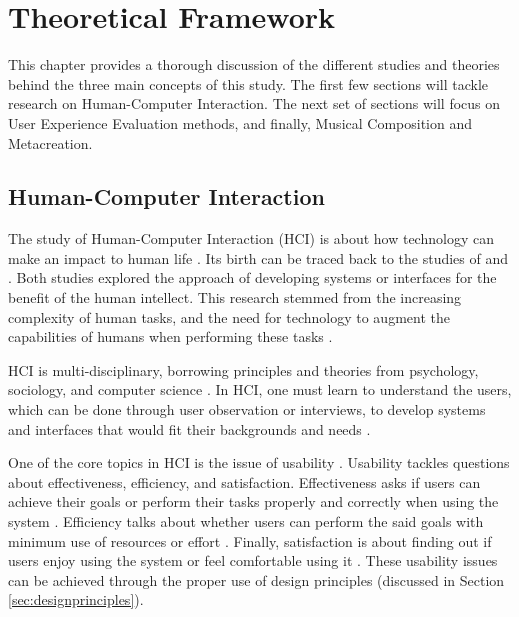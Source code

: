 %
%
%                 

\chapter{Theoretical Framework}

This chapter provides a thorough discussion of the different studies and theories behind the three main concepts of this study. The first few sections will tackle research on Human-Computer Interaction. The next set of sections will focus on User Experience Evaluation methods, and finally, Musical Composition and Metacreation. 

\section{Human-Computer Interaction}

	The study of Human-Computer Interaction (HCI) is about how technology can make an impact to human life \citep{dix2009human}. Its birth can be traced back to the studies of \citet{shackel1959ergonomics} and \citet{engelbart1962augmenting}. Both studies explored the approach of developing systems or interfaces for the benefit of the human intellect. This research stemmed from the increasing complexity of human tasks, and the need for technology to augment the capabilities of humans when performing these tasks \citep{engelbart1962augmenting}.
    
    HCI is multi-disciplinary, borrowing principles and theories from psychology, sociology, and computer science \citep{dix2009human, sinha2010human}. In HCI, one must learn to understand the users, which can be done through user observation or interviews, to develop systems and interfaces that would fit their backgrounds and needs \citep{fischer2001user}.
    
	One of the core topics in HCI is the issue of usability \citep{frokjaer2000measuring, dix2009human}. Usability tackles questions about effectiveness, efficiency, and satisfaction. Effectiveness asks if users can achieve their goals or perform their tasks properly and correctly when using the system \citep{frokjaer2000measuring}. Efficiency talks about whether users can perform the said goals with minimum use of resources or effort \citep{frokjaer2000measuring}. Finally, satisfaction is about finding out if users enjoy using the system or feel comfortable using it \citep{frokjaer2000measuring}. These usability issues can be achieved through the proper use of design principles (discussed in Section \ref{sec:designprinciples}).

